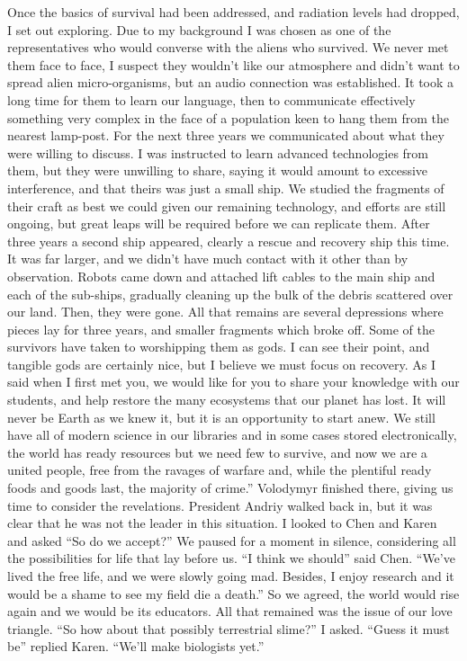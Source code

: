 \documentclass[a4paper]{article}
\begin{document}
Once the basics of survival had been addressed, and radiation levels had dropped, I set out exploring. Due to my background I was chosen as one of the representatives who would converse with the aliens who survived. We never met them face to face, I suspect they wouldn’t like our atmosphere and didn’t want to spread alien micro-organisms, but an audio connection was established. It took a long time for them to learn our language, then to communicate effectively something very complex in the face of a population keen to hang them from the nearest lamp-post. For the next three years we communicated about what they were willing to discuss. I was instructed to learn advanced technologies from them, but they were unwilling to share, saying it would amount to excessive interference, and that theirs was just a small ship. We studied the fragments of their craft as best we could given our remaining technology, and efforts are still ongoing, but great leaps will be required before we can replicate them.
After three years a second ship appeared, clearly a rescue and recovery ship this time. It was far larger, and we didn’t have much contact with it other than by observation. Robots came down and attached lift cables to the main ship and each of the sub-ships, gradually cleaning up the bulk of the debris scattered over our land. Then, they were gone. All that remains are several depressions where pieces lay for three years, and smaller fragments which broke off.
Some of the survivors have taken to worshipping them as gods. I can see their point, and tangible gods are certainly nice, but I believe we must focus on recovery. As I said when I first met you, we would like for you to share your knowledge with our students, and help restore the many ecosystems that our planet has lost. It will never be Earth as we knew it, but it is an opportunity to start anew. We still have all of modern science in our libraries and in some cases stored electronically, the world has ready resources but we need few to survive, and now we are a united people, free from the ravages of warfare and, while the plentiful ready foods and goods last, the majority of crime.”
Volodymyr finished there, giving us time to consider the revelations. President Andriy walked back in, but it was clear that he was not the leader in this situation.
I looked to Chen and Karen and asked “So do we accept?”
We paused for a moment in silence, considering all the possibilities for life that lay before us.
“I think we should” said Chen. “We’ve lived the free life, and we were slowly going mad. Besides, I enjoy research and it would be a shame to see my field die a death.”
So we agreed, the world would rise again and we would be its educators. All that remained was the issue of our love triangle.
“So how about that possibly terrestrial slime?” I asked.
“Guess it must be” replied Karen. “We’ll make biologists yet.”
\end{document}

